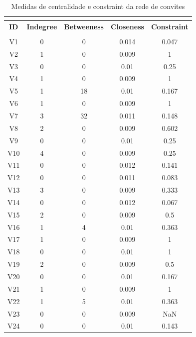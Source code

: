 \documentclass[a4paper, 12pt, openright, oneside, german, french, english, brazil]{abntex2}
\begin{document}
	
		\begin{SingleSpace}
		\begin{footnotesize}
			\begin{center}
				\begin{longtable}{c c c c c}
					\caption{Medidas de centralidade e constraint da rede de convites}\\
					\label{centralidades:convite}\\
					\hline
					\textbf{ID}  & \textbf{Indegree} & \textbf{Betweeness} & \textbf{Closeness} & \textbf{Constraint} \\
					\hline
					\endfirsthead
					\hline
					\endhead
					\hline
					\endfoot
					\hline
					\multicolumn{5}{l}{Fonte: Elaboração do autor}\\
					\endlastfoot
					V1 & 0 & 0 & 0.014 & 0.047 \\ 
					V2 & 1 & 0 & 0.009 & 1 \\ 
					V3 & 0 & 0 & 0.01 & 0.25 \\ 
					V4 & 1 & 0 & 0.009 & 1 \\ 
					V5 & 1 & 18 & 0.01 & 0.167 \\ 
					V6 & 1 & 0 & 0.009 & 1 \\ 
					V7 & 3 & 32 & 0.011 & 0.148 \\ 
					V8 & 2 & 0 & 0.009 & 0.602 \\ 
					V9 & 0 & 0 & 0.01 & 0.25 \\ 
					V10 & 4 & 0 & 0.009 & 0.25 \\ 
					V11 & 0 & 0 & 0.012 & 0.141 \\ 
					V12 & 0 & 0 & 0.011 & 0.083 \\ 
					V13 & 3 & 0 & 0.009 & 0.333 \\ 
					V14 & 0 & 0 & 0.012 & 0.067 \\ 
					V15 & 2 & 0 & 0.009 & 0.5 \\ 
					V16 & 1 & 4 & 0.01 & 0.363 \\ 
					V17 & 1 & 0 & 0.009 & 1 \\ 
					V18 & 0 & 0 & 0.01 & 1 \\ 
					V19 & 2 & 0 & 0.009 & 0.5 \\ 
					V20 & 0 & 0 & 0.01 & 0.167 \\ 
					V21 & 1 & 0 & 0.009 & 1 \\ 
					V22 & 1 & 5 & 0.01 & 0.363 \\ 
					V23 & 0 & 0 & 0.009 & NaN \\ 
					V24 & 0 & 0 & 0.01 & 0.143 \\ 

\end{longtable}
\end{center}
\end{footnotesize}
\end{SingleSpace}
\end{document}
